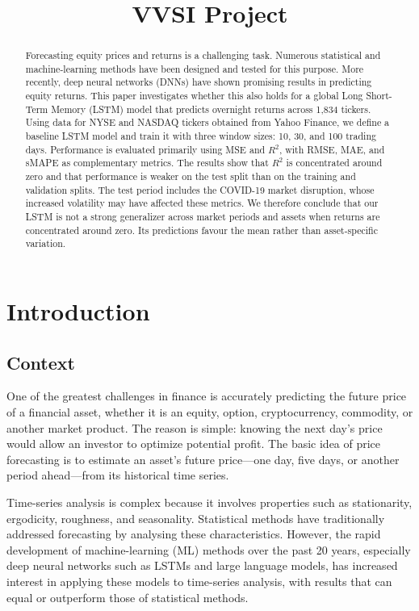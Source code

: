 \documentclass[12pt,a4paper]{article}
\title{VVSI Project}
\author{}
\date{}
\begin{document}
\maketitle

\begin{abstract}
Forecasting equity prices and returns is a challenging task. Numerous
statistical and machine-learning methods have been designed and tested for this
purpose. More recently, deep neural networks (DNNs) have shown promising results
in predicting equity returns. This paper investigates whether this also holds
for a global Long Short-Term Memory (LSTM) model that predicts overnight returns
across 1,834 tickers. Using data for NYSE and NASDAQ tickers obtained from Yahoo
Finance, we define a baseline LSTM model and train it with three window sizes:
10, 30, and 100 trading days. Performance is evaluated primarily using MSE and
$R^2$, with RMSE, MAE, and sMAPE as complementary metrics. The results show that
$R^2$ is concentrated around zero and that performance is weaker on the test
split than on the training and validation splits. The test period includes the
COVID-19 market disruption, whose increased volatility may have affected these
metrics. We therefore conclude that our LSTM is not a strong generalizer across
market periods and assets when returns are concentrated around zero. Its
predictions favour the mean rather than asset-specific variation.
\end{abstract}

\section{Introduction}

\subsection{Context}
One of the greatest challenges in finance is accurately predicting the future
price of a financial asset, whether it is an equity, option, cryptocurrency,
commodity, or another market product. The reason is simple: knowing the next
day's price would allow an investor to optimize potential profit. The basic idea
of price forecasting is to estimate an asset's future price---one day, five
days, or another period ahead---from its historical time series.

Time-series analysis is complex because it involves properties such as
stationarity, ergodicity, roughness, and seasonality. Statistical methods have
traditionally addressed forecasting by analysing these characteristics.
However, the rapid development of machine-learning (ML) methods over the past
20 years, especially deep neural networks such as LSTMs and large language
models, has increased interest in applying these models to time-series analysis,
with results that can equal or outperform those of statistical methods.
\end{document}
